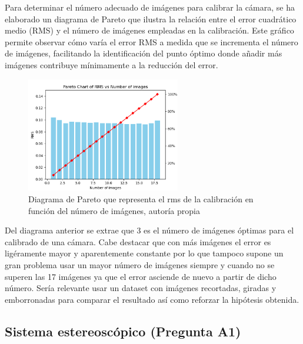 \documentclass[a4paper,12pt]{article}
\begin{document}
{\vspace{0.5cm}

Para determinar el número adecuado de imágenes para calibrar la cámara, se ha elaborado un diagrama de Pareto que ilustra la relación entre el error cuadrático medio (RMS) y el número de imágenes empleadas en la calibración. Este gráfico permite observar cómo varía el error RMS a medida que se incrementa el número de imágenes, facilitando la identificación del punto óptimo donde añadir más imágenes contribuye mínimamente a la reducción del error.

\vspace{0.5cm}

\begin{figure}[h]
    \centering
    \includegraphics[width=0.6\textwidth]{fonts/pareto.png}
    \caption{Diagrama de Pareto que representa el rms de la calibración en función del número de imágenes, autoría propia}
    \label{fig:imagen}
\end{figure}

\vspace{0.5cm}

Del diagrama anterior se extrae que 3 es el número de imágenes óptimas para el calibrado de una cámara. Cabe destacar que con más imágenes el error es ligéramente mayor y aparentemente constante por lo que tampoco supone un gran problema usar un mayor número de imágenes siempre y cuando no se superen las 17 imágenes ya que el error asciende de nuevo a partir de dicho número. Sería relevante usar un dataset con imágenes recortadas, giradas y emborronadas para comparar el resultado así como reforzar la hipótesis obtenida.

\vspace{0.5cm}

\subsection{Sistema estereoscópico (Pregunta A1)}

}
\end{document}
